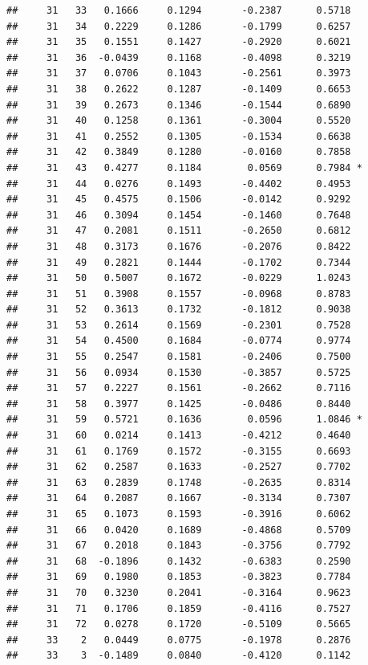 \documentclass[
]{article}
\begin{document}
\begin{verbatim}
##     31   33   0.1666     0.1294       -0.2387      0.5718  
##     31   34   0.2229     0.1286       -0.1799      0.6257  
##     31   35   0.1551     0.1427       -0.2920      0.6021  
##     31   36  -0.0439     0.1168       -0.4098      0.3219  
##     31   37   0.0706     0.1043       -0.2561      0.3973  
##     31   38   0.2622     0.1287       -0.1409      0.6653  
##     31   39   0.2673     0.1346       -0.1544      0.6890  
##     31   40   0.1258     0.1361       -0.3004      0.5520  
##     31   41   0.2552     0.1305       -0.1534      0.6638  
##     31   42   0.3849     0.1280       -0.0160      0.7858  
##     31   43   0.4277     0.1184        0.0569      0.7984 *
##     31   44   0.0276     0.1493       -0.4402      0.4953  
##     31   45   0.4575     0.1506       -0.0142      0.9292  
##     31   46   0.3094     0.1454       -0.1460      0.7648  
##     31   47   0.2081     0.1511       -0.2650      0.6812  
##     31   48   0.3173     0.1676       -0.2076      0.8422  
##     31   49   0.2821     0.1444       -0.1702      0.7344  
##     31   50   0.5007     0.1672       -0.0229      1.0243  
##     31   51   0.3908     0.1557       -0.0968      0.8783  
##     31   52   0.3613     0.1732       -0.1812      0.9038  
##     31   53   0.2614     0.1569       -0.2301      0.7528  
##     31   54   0.4500     0.1684       -0.0774      0.9774  
##     31   55   0.2547     0.1581       -0.2406      0.7500  
##     31   56   0.0934     0.1530       -0.3857      0.5725  
##     31   57   0.2227     0.1561       -0.2662      0.7116  
##     31   58   0.3977     0.1425       -0.0486      0.8440  
##     31   59   0.5721     0.1636        0.0596      1.0846 *
##     31   60   0.0214     0.1413       -0.4212      0.4640  
##     31   61   0.1769     0.1572       -0.3155      0.6693  
##     31   62   0.2587     0.1633       -0.2527      0.7702  
##     31   63   0.2839     0.1748       -0.2635      0.8314  
##     31   64   0.2087     0.1667       -0.3134      0.7307  
##     31   65   0.1073     0.1593       -0.3916      0.6062  
##     31   66   0.0420     0.1689       -0.4868      0.5709  
##     31   67   0.2018     0.1843       -0.3756      0.7792  
##     31   68  -0.1896     0.1432       -0.6383      0.2590  
##     31   69   0.1980     0.1853       -0.3823      0.7784  
##     31   70   0.3230     0.2041       -0.3164      0.9623  
##     31   71   0.1706     0.1859       -0.4116      0.7527  
##     31   72   0.0278     0.1720       -0.5109      0.5665  
##     33    2   0.0449     0.0775       -0.1978      0.2876  
##     33    3  -0.1489     0.0840       -0.4120      0.1142  

\end{verbatim}
\end{document}
